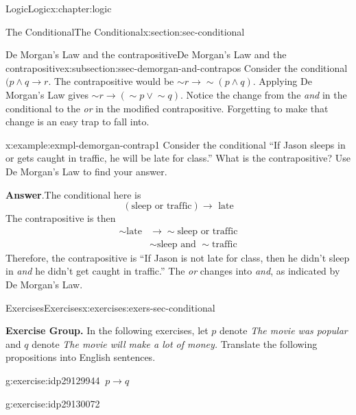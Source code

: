 \documentclass[twoside,10pt,]{book}
\newcommand{\blocktitlefont}{\relax}
\numberwithin{equation}{section}
\newcommand{\conditional}{{p {\rightarrow} q}}
\newcommand{\amp}{&}
\begin{document}
\begin{chapterptx}{Logic}{}{Logic}{}{}{x:chapter:logic}
\begin{sectionptx}{The Conditional}{}{The Conditional}{}{}{x:section:sec-conditional}
\begin{subsectionptx}{De Morgan's Law and the contrapositive}{}{De Morgan's Law and the contrapositive}{}{}{x:subsection:ssec-demorgan-and-contrapos}
Consider the conditional \((p {\wedge}{} q {\rightarrow}{} r\).  The contrapositive would be \(\sim\!{r} {\rightarrow}{} \sim\!{(p {\wedge}{} q)}\).  Applying De Morgan's Law gives \(\sim\!{r} {\rightarrow}{} (\sim\!{p} {\vee}{} \sim\!{q})\).  Notice the change from the \emph{and} in the conditional to the \emph{or} in the modified contrapositive.  Forgetting to make that change is an easy trap to fall into.  \begin{example}{}{x:example:exmpl-demorgan-contrap1}%
Consider the conditional ``If Jason sleeps in or gets caught in traffic, he will be late for class.''  What is the contrapositive?  Use De Morgan's Law to find your answer.\par\smallskip%
\noindent\textbf{\blocktitlefont Answer}.\label{g:answer:idp29128152}{}\hypertarget{g:answer:idp29128152}{}\quad{}The conditional here is%
\begin{equation*}
(\text{sleep or traffic}){\rightarrow}\text{ late}
\end{equation*}
The contrapositive is then%
\begin{align*}
\sim\!{\text{late}} \amp {\rightarrow} \sim\!{\text{sleep or traffic}}\\
\amp \sim\!{\text{sleep}}\text{ and }\sim\!{\text{traffic}}
\end{align*}
Therefore, the contrapositive is ``If Jason is not late for class, then he didn't sleep in \emph{and} he didn't get caught in traffic.''  The \emph{or} changes into \emph{and}, as indicated by De Morgan's Law.\end{example}
%
\end{subsectionptx}
%
%
\typeout{************************************************}
\typeout{************************************************}
%
\begin{exercises-subsection}{Exercises}{}{Exercises}{}{}{x:exercises:exers-sec-conditional}
\par\medskip\noindent%
\textbf{Exercise Group.}\space\space%
In the following exercises, let \(p\) denote \emph{The movie was popular} and \(q\) denote \emph{The movie will make a lot of money.}  Translate the following propositions into English sentences.\begin{exercisegroup}
\begin{divisionexerciseeg}{1}{}{}{g:exercise:idp29129944}%
\(\ \conditional\)\end{divisionexerciseeg}%
\begin{divisionexerciseeg}{2}{}{}{g:exercise:idp29130072}%

\end{divisionexerciseeg}
\end{exercisegroup}
\end{exercises-subsection}
\end{sectionptx}
\end{chapterptx}
\end{document}
